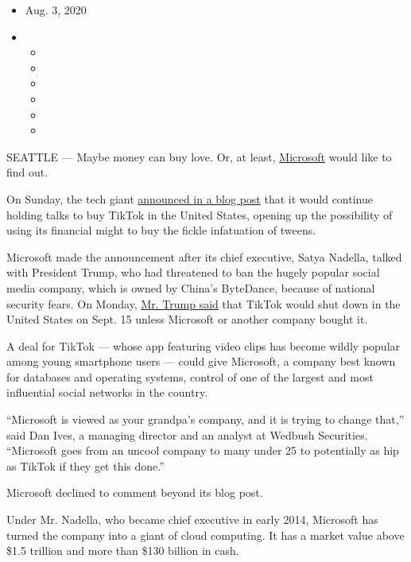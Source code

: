 \begin{itemize}
\item
  Aug. 3, 2020
\item
  \begin{itemize}
  \item
  \item
  \item
  \item
  \item
  \item
  \end{itemize}
\end{itemize}

SEATTLE --- Maybe money can buy love. Or, at least,
\href{https://www.nytimes.com/2020/08/03/us/navy-seal-museum-kaepernick.html}{Microsoft}
would like to find out.

On Sunday, the tech giant
\href{https://blogs.microsoft.com/blog/2020/08/02/microsoft-to-continue-discussions-on-potential-tiktok-purchase-in-the-united-states/}{announced
in a blog post} that it would continue holding talks to buy TikTok in
the United States, opening up the possibility of using its financial
might to buy the fickle infatuation of tweens.

Microsoft made the announcement after its chief executive, Satya
Nadella, talked with President Trump, who had threatened to ban the
hugely popular social media company, which is owned by China's
ByteDance, because of national security fears. On Monday,
\href{https://www.nytimes.com/2020/08/03/technology/trump-tiktok-microsoft.html?action=click\&module=Top\%20Stories\&pgtype=Homepage}{Mr.
Trump said} that TikTok would shut down in the United States on Sept. 15
unless Microsoft or another company bought it.

A deal for TikTok --- whose app featuring video clips has become wildly
popular among young smartphone users --- could give Microsoft, a company
best known for databases and operating systems, control of one of the
largest and most influential social networks in the country.

``Microsoft is viewed as your grandpa's company, and it is trying to
change that,'' said Dan Ives, a managing director and an analyst at
Wedbush Securities. ``Microsoft goes from an uncool company to many
under 25 to potentially as hip as TikTok if they get this done.''

Microsoft declined to comment beyond its blog post.

Under Mr. Nadella, who became chief executive in early 2014, Microsoft
has turned the company into a giant of cloud computing. It has a market
value above \$1.5 trillion and more than \$130 billion in cash.

